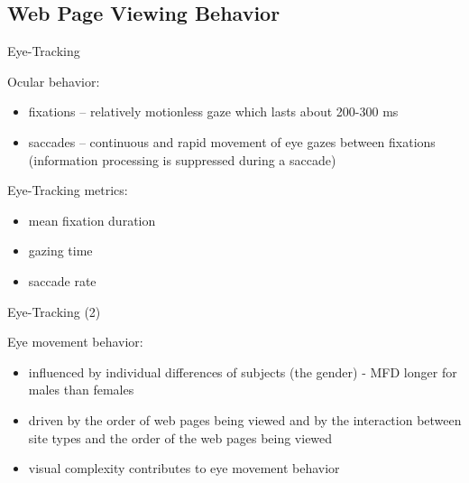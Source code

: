 \subsection{Web Page Viewing Behavior}


\begin{frame}{Eye-Tracking}

Ocular behavior:
\begin{itemize}
	\item fixations – relatively motionless gaze which lasts about 200-300 ms
	\item saccades – continuous and rapid movement of eye gazes between fixations (information processing is suppressed during a saccade) \newline
\end{itemize}

Eye-Tracking metrics:
\begin{itemize}
	\item mean fixation duration
	\item gazing time
	\item saccade rate \newline
\end{itemize}

\end{frame}


\begin{frame}{Eye-Tracking (2)}

Eye movement behavior:
\begin{itemize}
	\item influenced by individual differences of subjects (the gender) \newline
		- MFD longer for males than females
	\item driven by the order of web pages being viewed and by the interaction between site types and the order of the web pages being viewed
	\item visual complexity contributes to eye movement behavior
\end{itemize}

\end{frame}


